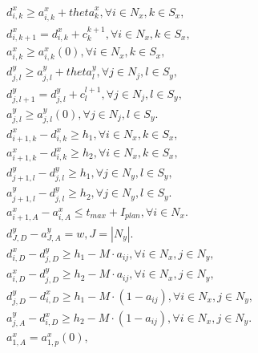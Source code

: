 \begin{align}
  & d_{i , k}^{x} \geq a_{i , k}^{x} + \mathit{theta}_{k}^{x} , \forall i \in N_{x} , k \in S_{x} , \tag{eq\_0002} \\
  & d_{i , k + 1}^{x} = d_{i , k}^{x} + c_{k}^{k + 1} , \forall i \in N_{x} , k \in S_{x} , \tag{eq\_0003} \\
  & a_{i , k}^{x} \geq a_{i , k}^{x} \left(0\right) , \forall i \in N_{x} , k \in S_{x} , \tag{eq\_0004} \\
  & d_{j , l}^{y} \geq a_{j , l}^{y} + \mathit{theta}_{l}^{y} , \forall j \in N_{j} , l \in S_{y} , \tag{eq\_0005} \\
  & d_{j , l + 1}^{y} = d_{j , l}^{y} + c_{l}^{l + 1} , \forall j \in N_{j} , l \in S_{y} , \tag{eq\_0006} \\
  & a_{j , l}^{y} \geq a_{j , l}^{y} \left(0\right) , \forall j \in N_{j} , l \in S_{y} . \tag{eq\_0007} \\
  & d_{i + 1 , k}^{x} - d_{i , k}^{x} \geq h_{1} , \forall i \in N_{x} , k \in S_{x} , \tag{eq\_0008} \\
  & a_{i + 1 , k}^{x} - d_{i , k}^{x} \geq h_{2} , \forall i \in N_{x} , k \in S_{x} , \tag{eq\_0009} \\
  & d_{j + 1 , l}^{y} - d_{j , l}^{y} \geq h_{1} , \forall j \in N_{y} , l \in S_{y} , \tag{eq\_0010} \\
  & a_{j + 1 , l}^{y} - d_{j , l}^{y} \geq h_{2} , \forall j \in N_{y} , l \in S_{y} . \tag{eq\_0011} \\
  & a_{i + 1 , A}^{x} - a_{i , A}^{x} \leq t_{\mathit{max}} + I_{p l a n} , \forall i \in N_{x} . \tag{eq\_0012} \\
  & d_{J , D}^{y} - a_{J , A}^{y} = w , J = \left|N_{y}\right| . \tag{eq\_0013} \\
  & d_{i , D}^{x} - d_{j , D}^{y} \geq h_{1} - M \cdot a_{i j} , \forall i \in N_{x} , j \in N_{y} , \tag{eq\_0014} \\
  & a_{i , D}^{x} - d_{j , D}^{y} \geq h_{2} - M \cdot a_{i j} , \forall i \in N_{x} , j \in N_{y} , \tag{eq\_0015} \\
  & d_{j , D}^{y} - d_{i , D}^{x} \geq h_{1} - M \cdot \left(1 - a_{i j}\right) , \forall i \in N_{x} , j \in N_{y} , \tag{eq\_0016} \\
  & a_{j , A}^{y} - d_{i , D}^{x} \geq h_{2} - M \cdot \left(1 - a_{i j}\right) , \forall i \in N_{x} , j \in N_{y} . \tag{eq\_0017} \\
  & a_{1 , A}^{x} = a_{1 , p}^{x} \left(0\right) , \tag{eq\_0018} \\

\end{align}
